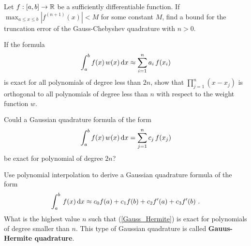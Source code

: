 \begin{question}
Let $f:[a,b]\rightarrow \mathbb{R}$ be a sufficiently differentiable
function.  If
$\displaystyle \max_{a\leq x \leq b} |f^{(n+1)}(x)| < M$ for some
constant $M$, find a bound for the truncation error of
the Gauss-Chebyshev quadrature with $n>0$.
\label{diffQ38}
\end{question}

\begin{question}
If the formula
\[
\int_a^b f(x)\,w(x)\,\mathrm{d}x \approx \sum_{i=1}^n a_i \,f(x_i)
\]
is exact for all polynomials of degree less than $2n$, show that
$\displaystyle \prod_{j=1}^n (x-x_j)$ is orthogonal to all polynomials
of degree less than $n$ with respect to the weight function $w$.
\label{diffQ39}
\end{question}

\begin{question}
Could a Gaussian quadrature formula of the form
\begin{equation}\label{2nQuadrQuestEqu}
\int_a^b f(x)\,w(x) \,\mathrm{d}x = \sum_{j=1}^n c_j \,f(x_j)
\end{equation}
be exact for polynomial of degree $2n$?
\label{diffQ40}
\end{question}

\begin{question}
Use polynomial interpolation to derive a Gaussian quadrature
formula of the form
\begin{equation} \label{Gauss_Hermite}
\int_a^b\,f(x)\,\mathrm{d}x \approx c_0 f(a) + c_1 f(b) + c_2 f'(a) + c_3f'(b) \ .
\end{equation}
What is the highest value $n$ such that (\ref{Gauss_Hermite}) is exact
for polynomials of degree smaller than $n$.  This type of Gaussian
quadrature is called
{\bfseries Gauus-Hermite quadrature}.
\label{diffQ41}
\end{question}


